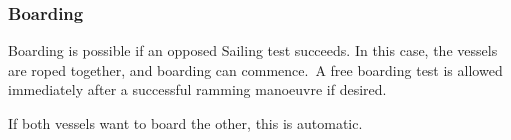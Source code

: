 \subsubsection{Boarding}
Boarding is possible if an opposed Sailing test succeeds. In this case, the vessels are roped together, and boarding can commence. A free boarding test is allowed immediately after a successful ramming manoeuvre if desired.

If both vessels want to board the other, this is automatic.





